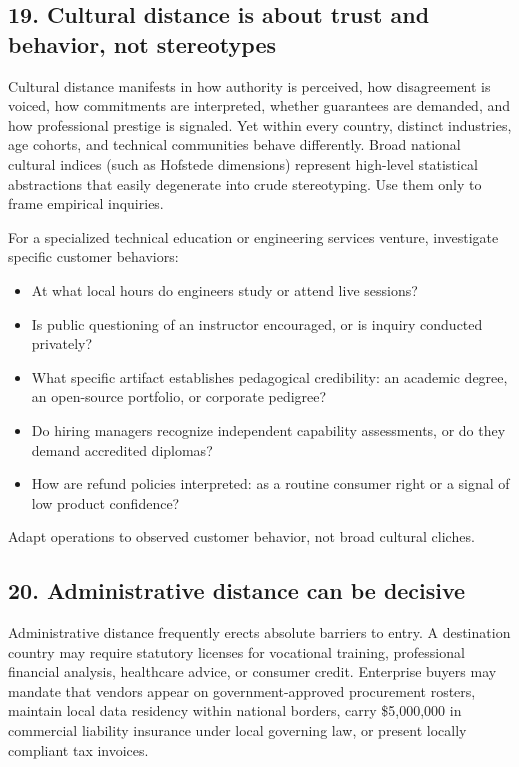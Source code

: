 \subsection{19. Cultural distance is about trust and behavior, not stereotypes}

Cultural distance manifests in how authority is perceived, how disagreement is voiced, how commitments are interpreted, whether guarantees are demanded, and how professional prestige is signaled. Yet within every country, distinct industries, age cohorts, and technical communities behave differently. Broad national cultural indices (such as Hofstede dimensions) represent high-level statistical abstractions that easily degenerate into crude stereotyping. Use them only to frame empirical inquiries.

For a specialized technical education or engineering services venture, investigate specific customer behaviors:
\begin{itemize}
    \item At what local hours do engineers study or attend live sessions?
    \item Is public questioning of an instructor encouraged, or is inquiry conducted privately?
    \item What specific artifact establishes pedagogical credibility: an academic degree, an open-source portfolio, or corporate pedigree?
    \item Do hiring managers recognize independent capability assessments, or do they demand accredited diplomas?
    \item How are refund policies interpreted: as a routine consumer right or a signal of low product confidence?
\end{itemize}
Adapt operations to observed customer behavior, not broad cultural cliches.

\subsection{20. Administrative distance can be decisive}

Administrative distance frequently erects absolute barriers to entry. A destination country may require statutory licenses for vocational training, professional financial analysis, healthcare advice, or consumer credit. Enterprise buyers may mandate that vendors appear on government-approved procurement rosters, maintain local data residency within national borders, carry \$5,000,000 in commercial liability insurance under local governing law, or present locally compliant tax invoices.

